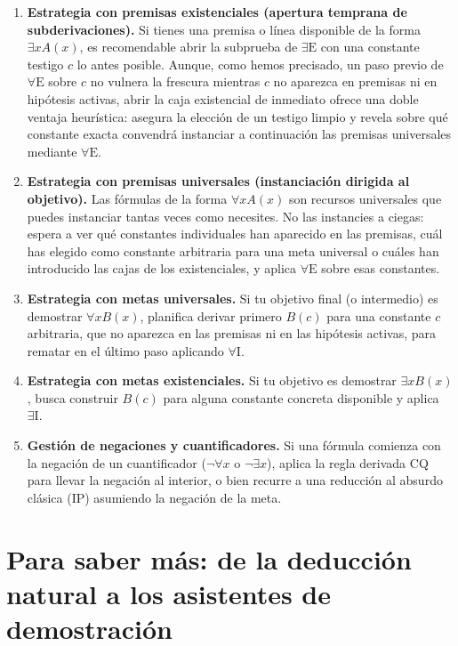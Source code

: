 \begin{enumerate}
    \item \textbf{Estrategia con premisas existenciales (apertura temprana de subderivaciones).}  
    Si tienes una premisa o línea disponible de la forma $\exists x A(x)$, es recomendable abrir la subprueba de $\exists\text{E}$ con una constante testigo $c$ lo antes posible. Aunque, como hemos precisado, un paso previo de $\forall\text{E}$ sobre $c$ no vulnera la frescura mientras $c$ no aparezca en premisas ni en hipótesis activas, abrir la caja existencial de inmediato ofrece una doble ventaja heurística: asegura la elección de un testigo limpio y revela sobre qué constante exacta convendrá instanciar a continuación las premisas universales mediante $\forall\text{E}$.
    
    \item \textbf{Estrategia con premisas universales (instanciación dirigida al objetivo).}  
    Las fórmulas de la forma $\forall x A(x)$ son recursos universales que puedes instanciar tantas veces como necesites. No las instancies a ciegas: espera a ver qué constantes individuales han aparecido en las premisas, cuál has elegido como constante arbitraria para una meta universal o cuáles han introducido las cajas de los existenciales, y aplica $\forall\text{E}$ sobre esas constantes.
    
    \item \textbf{Estrategia con metas universales.}  
    Si tu objetivo final (o intermedio) es demostrar $\forall x B(x)$, planifica derivar primero $B(c)$ para una constante $c$ arbitraria, que no aparezca en las premisas ni en las hipótesis activas, para rematar en el último paso aplicando $\forall\text{I}$.
    
    \item \textbf{Estrategia con metas existenciales.}  
    Si tu objetivo es demostrar $\exists x B(x)$, busca construir $B(c)$ para alguna constante concreta disponible y aplica $\exists\text{I}$.
    
    \item \textbf{Gestión de negaciones y cuantificadores.}  
    Si una fórmula comienza con la negación de un cuantificador ($\neg \forall x$ o $\neg \exists x$), aplica la regla derivada CQ para llevar la negación al interior, o bien recurre a una reducción al absurdo clásica (IP) asumiendo la negación de la meta.
\end{enumerate}

\section{Para saber más: de la deducción natural a los asistentes de demostración}\label{sec:asistentes}

